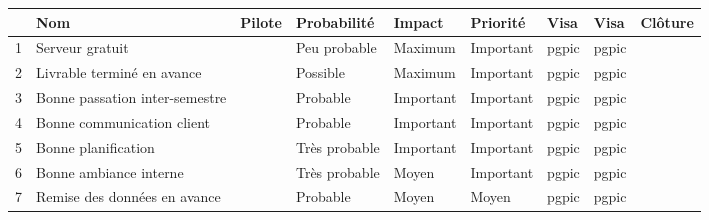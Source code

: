 \documentclass[asi]{picINSA}
\begin{document}
\begin{longtable}{|p{0.3cm}|p{2.5cm}|p{2cm}|p{2cm}|p{1.8cm}|p{1.5cm}|p{1cm}|p{1cm}|p{1.5cm}|}
			\hline
			\rowcolor{gray!40}
			\No & Nom & Pilote & Probabilité & Impact & Priorité & Visa \RQCourt{} & Visa \CPCourt{} & Clôture \\\hline
			 1 & Serveur gratuit & \Matthieu & Peu probable & Maximum & Important & pgpic & pgpic & \\\hline
			 2 & Livrable terminé en avance & \Kafui & Possible & Maximum & Important & pgpic & pgpic & \\\hline
			 3 & Bonne passation inter-semestre & \Pierre & Probable & Important & Important & pgpic & pgpic & \\\hline
			 4 & Bonne communication client & \Florian & Probable & Important & Important & pgpic & pgpic & \\\hline
			 5 & Bonne planification & \Pierre & Très probable & Important & Important & pgpic & pgpic & \\\hline
			 6 & Bonne ambiance interne & \Michel & Très probable & Moyen & Important & pgpic & pgpic & \\\hline
			 7 & Remise des données en avance & \Sergi & Probable & Moyen & Moyen & pgpic & pgpic &  \\\hline
\end{longtable}
\end{document}
